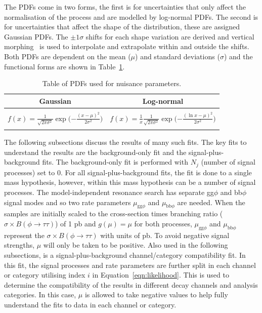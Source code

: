 The \ac{PDF}s come in two forms, the first is for uncertainties that only affect the normalisation of the process and are modelled by log-normal \ac{PDF}s. 
The second is for uncertainties that affect the shape of the distribution, these are assigned Gaussian \ac{PDF}s.
The $\pm1\sigma$ shifts for each shape variation are derived and vertical morphing~\cite{Conway:2011in} is used to interpolate and extrapolate within and outside the shifts.
Both \ac{PDF}s are dependent on the mean ($\mu$) and standard deviations ($\sigma$) and the functional forms are shown in Table~\ref{tab:pdfs}. \\

\begin{table}[!hbtp]
    \centering
    \begin{tabular}{|c|c|}
         \hline
         Gaussian & Log-normal  \\
         \hline
         \hline
          & \\
         $f(x) = \frac{1}{\sqrt{2\pi\sigma^{2}}} \exp\Big({-\frac{(x - \mu)^2}{2\sigma^2}}\Big)$ & $f(x) = \frac{1}{x} \frac{1}{\sqrt{2\pi\sigma^{2}}} \exp\Big({-\frac{(\ln x - \mu)^2}{2\sigma^2}}\Big)$ \\
          & \\
         \hline
    \end{tabular}
    \caption[PDFs used for nuisance parameters.]{Table of PDFs used for nuisance parameters.}
    \label{tab:pdfs}
\end{table}

The following subsections discuss the results of many such fits.
The key fits to understand the results are the background-only fit and the signal-plus-background fits.
The background-only fit is performed with $N_j$ (number of signal processes) set to 0.
For all signal-plus-background fits, the fit is done to a single mass hypothesis, however, within this mass hypothesis can be a number of signal processes.
The model-independent resonance search has separate gg$\phi$ and bb$\phi$ signal modes and so two rate parameters $\mu_{\text{gg}\phi}$ and $\mu_{\text{bb}\phi}$ are needed.
When the samples are initially scaled to the cross-section times branching ratio ($\sigma \times B (\phi\rightarrow\tau\tau)$) of 1 pb and $g(\mu)=\mu$ for both processes, $\mu_{\text{gg}\phi}$ and $\mu_{\text{bb}\phi}$ represent the $\sigma \times B (\phi\rightarrow\tau\tau)$ with units of pb.
To avoid negative signal strengths, $\mu$ will only be taken to be positive.
Also used in the following subsections, is a signal-plus-background channel/category compatibility fit.
In this fit, the signal processes and rate parameters are further split in each channel or category utilising index $i$ in Equation~\ref{eqn:likelihood}.
This is used to determine the compatibility of the results in different decay channels and analysis categories.
In this case, $\mu$ is allowed to take negative values to help fully understand the fits to data in each channel or category. \\

